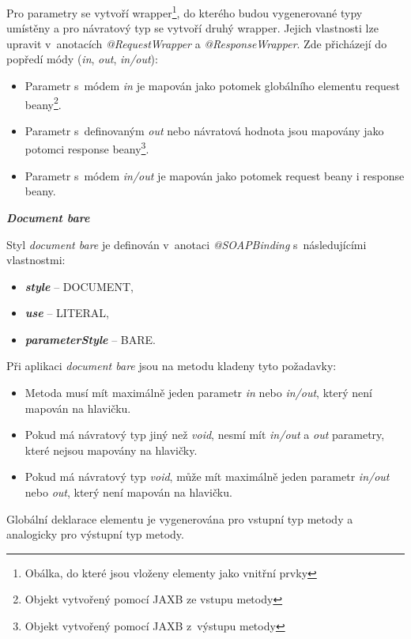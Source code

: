 \documentclass[11pt,twoside,a4paper]{book}
\begin{document}
Pro parametry se vytvoří wrapper\footnote{Obálka, do které jsou vloženy elementy
jako vnitřní prvky}, do kterého budou vygenerované typy umístěny a pro návratový
typ se vytvoří druhý wrapper. Jejich vlastnosti lze upravit v~anotacích
{\em @RequestWrapper} a {\em @ResponseWrapper}. Zde přicházejí do popředí módy
({\em in}, {\em out}, {\em in/out}):

\begin{itemize}
  \item Parametr s~módem {\em in} je mapován jako potomek globálního elementu
  request beany\footnote{Objekt vytvořený pomocí JAXB ze vstupu metody}.
  \item Parametr s~definovaným {\em out} nebo návratová hodnota jsou mapovány
  jako potomci response beany\footnote{Objekt vytvořený pomocí JAXB z~výstupu metody}.
  \item Parametr s~módem {\em in/out} je mapován jako potomek request beany i
  response beany.
\end{itemize}

\textbf{\textit{Document bare}}

Styl {\em document bare} je definován v~anotaci {\em @SOAPBinding}
s~následujícími vlastnostmi:

\begin{itemize}
  \item \textbf{\textit{style}} – DOCUMENT,
  \item \textbf{\textit{use}} – LITERAL,
  \item \textbf{\textit{parameterStyle}} – BARE.
\end{itemize}

Při aplikaci {\em document bare} jsou na metodu kladeny tyto požadavky:

\begin{itemize}
  \item Metoda musí mít maximálně jeden parametr {\em in} nebo {\em in/out},
  který není mapován na hlavičku.
  \item Pokud má návratový typ jiný než {\em void}, nesmí mít {\em in/out} a
  {\em out} parametry, které nejsou mapovány na hlavičky.
  \item Pokud má návratový typ {\em void}, může mít maximálně jeden parametr
  {\em in/out} nebo {\em out}, který není mapován na hlavičku.
\end{itemize}

Globální deklarace elementu je vygenerována pro vstupní typ metody a analogicky pro
výstupní typ metody.
\end{document}
